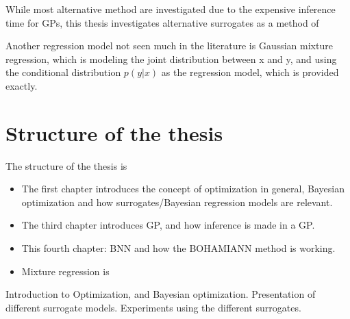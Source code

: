 While most alternative method are investigated due to the expensive inference time for GPs, 
this thesis investigates alternative surrogates as a method of 

Another regression model not seen much in the literature is Gaussian mixture regression, which
is modeling the joint distribution between x and y, and using the conditional distribution $p(y|x)$
as the regression model, which is provided exactly. 

\section{Structure of the thesis}
The structure of the thesis is
\begin{itemize}
    \item The first chapter introduces the concept of optimization in general, Bayesian optimization 
    and how surrogates/Bayesian regression models are relevant.
    \item The third chapter introduces GP, and how inference is made in a GP. 
    \item This fourth chapter: BNN and how the BOHAMIANN method is working. 
    \item Mixture regression is 
\end{itemize}
Introduction to Optimization, and Bayesian optimization. 
Presentation of different surrogate models. 
Experiments using the different surrogates. 







